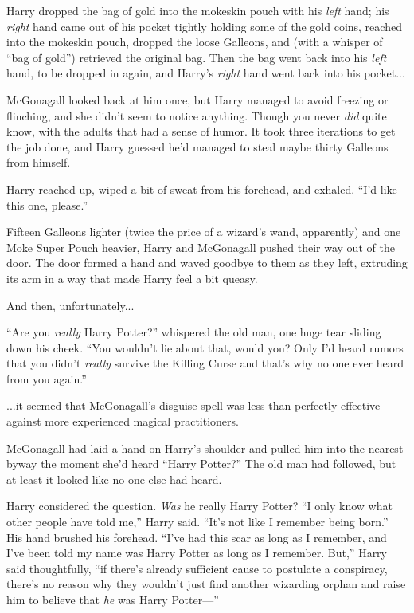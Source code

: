 Harry dropped the bag of gold into the mokeskin pouch with his \emph{left} hand; his \emph{right} hand came out of his pocket tightly holding some of the gold coins, reached into the mokeskin pouch, dropped the loose Galleons, and (with a whisper of “bag of gold”) retrieved the original bag. Then the bag went back into his \emph{left} hand, to be dropped in again, and Harry’s \emph{right} hand went back into his pocket...

McGonagall looked back at him once, but Harry managed to avoid freezing or flinching, and she didn’t seem to notice anything. Though you never \emph{did} quite know, with the adults that had a sense of humor. It took three iterations to get the job done, and Harry guessed he’d managed to steal maybe thirty Galleons from himself.

Harry reached up, wiped a bit of sweat from his forehead, and exhaled. “I’d like this one, please.”

Fifteen Galleons lighter (twice the price of a wizard’s wand, apparently) and one Moke Super Pouch  heavier, Harry and McGonagall pushed their way out of the door. The door formed a hand and waved goodbye to them as they left, extruding its arm in a way that made Harry feel a bit queasy.

And then, unfortunately...

“Are you \emph{really} Harry Potter?” whispered the old man, one huge tear sliding down his cheek. “You wouldn’t lie about that, would you? Only I’d heard rumors that you didn’t \emph{really} survive the Killing Curse and that’s why no one ever heard from you again.”

...it seemed that McGonagall’s disguise spell was less than perfectly effective against more experienced magical practitioners.

McGonagall had laid a hand on Harry’s shoulder and pulled him into the nearest byway the moment she’d heard “Harry Potter?” The old man had followed, but at least it looked like no one else had heard.

Harry considered the question. \emph{Was} he really Harry Potter? “I only know what other people have told me,” Harry said. “It’s not like I remember being born.” His hand brushed his forehead. “I’ve had this scar as long as I remember, and I’ve been told my name was Harry Potter as long as I remember. But,” Harry said thoughtfully, “if there’s already sufficient cause to postulate a conspiracy, there’s no reason why they wouldn’t just find another wizarding orphan and raise him to believe that \emph{he} was Harry Potter—”

